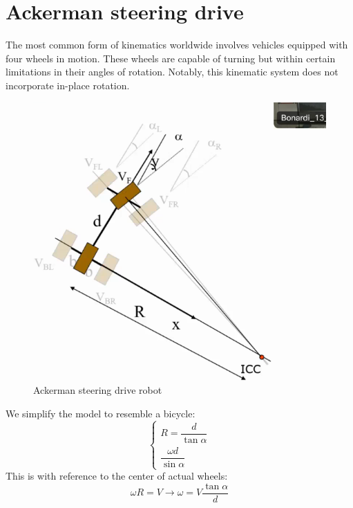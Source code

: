 \section{Ackerman steering drive}

The most common form of kinematics worldwide involves vehicles equipped with four wheels in motion. 
These wheels are capable of turning but within certain limitations in their angles of rotation. 
Notably, this kinematic system does not incorporate in-place rotation.
\begin{figure}[H]
    \centering
    \includegraphics[width=0.25\linewidth]{images/ack.png} 
    \caption{Ackerman steering drive robot}
\end{figure}
We simplify the model to resemble a bicycle:
\[\begin{cases}
    R=\dfrac{d}{\tan\alpha} \\
    \dfrac{\omega d}{\sin\alpha}
\end{cases}\]
This is with reference to the center of actual wheels:
\[\omega R = V \rightarrow \omega=V\dfrac{\tan\alpha}{d}\]